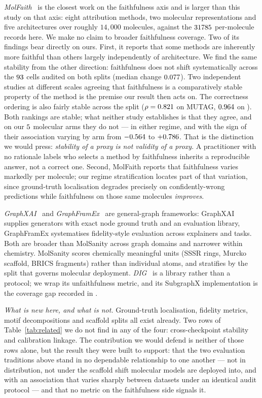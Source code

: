 \emph{MolFaith}~\cite{molfaith} is the closest work on the faithfulness axis
and is larger than this study on that axis: eight attribution methods, two
molecular representations and five architectures over roughly $14{,}000$
molecules, against the $31785{}$ per-molecule records here. We make no
claim to broader faithfulness coverage. Two of its findings bear directly on
ours. First, it reports that some methods are inherently more faithful than
others largely independently of architecture. We find the same stability from
the other direction: faithfulness does not shift systematically across the
$93{}$ cells audited on both splits (median change
$0.077{}$). Two independent studies at different scales agreeing
that faithfulness is a comparatively stable property of the method is the
premise our result then acts on. The correctness ordering is also fairly
stable across the split ($\rho=0.821{}$ on MUTAG,
$0.964{}$ on \molDataset{}). Both rankings are stable; what neither
study establishes is that they agree, and on our $5{}$ molecular
arms they do not --- in either regime, and with the sign of their association
varying by arm from $-0.564{}$ to $+0.786{}$. That is the
distinction we would press: \emph{stability of a proxy is not validity of a
proxy}. A practitioner with no rationale labels who selects a method by
faithfulness inherits a reproducible answer, not a correct one. Second,
MolFaith reports that faithfulness varies markedly per molecule; our regime
stratification locates part of that variation, since ground-truth localisation
degrades precisely on confidently-wrong predictions while faithfulness on those
same molecules \emph{improves}.

\emph{GraphXAI}~\cite{graphxai} and \emph{GraphFramEx}~\cite{graphframex} are
general-graph frameworks: GraphXAI supplies generators with exact node ground
truth and an evaluation library, GraphFramEx systematises fidelity-style
evaluation across explainers and tasks. Both are broader than MolSanity across
graph domains and narrower within chemistry. MolSanity scores chemically
meaningful units (SSSR rings, Murcko scaffold, BRICS fragments) rather than
individual atoms, and stratifies by the split that governs molecular
deployment. \emph{DIG}~\cite{dig} is a library rather than a protocol; we wrap
its unfaithfulness metric, and its SubgraphX implementation is the coverage gap
recorded in .

\emph{What is new here, and what is not.} Ground-truth localisation,
fidelity metrics, motif decompositions and scaffold splits all exist already.
Two rows of Table~\ref{tab:related} we do not find in any of the four:
cross-checkpoint stability and calibration linkage. The contribution we would
defend is neither of those rows alone, but the result they were built to
support: that the two evaluation traditions above stand in no dependable
relationship to one another --- not in distribution, not under the scaffold
shift molecular models are deployed into, and with an association that varies
sharply between datasets under an identical audit protocol --- and that no
metric on the faithfulness side signals it.


